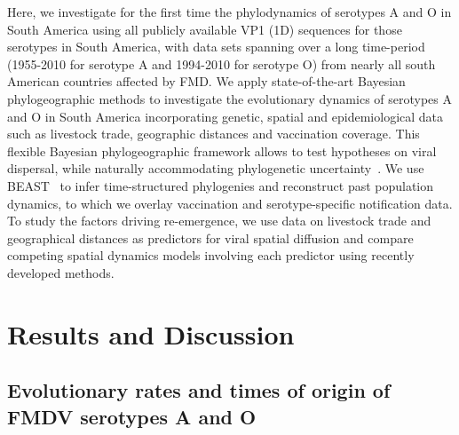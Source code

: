 \documentclass[10pt]{article}
\begin{document}
Here, we investigate for the first time the phylodynamics of serotypes A and O in South America using all publicly available VP1 (1D) sequences for those serotypes in South America, with data sets spanning over a long time-period (1955-2010 for serotype A and 1994-2010 for serotype O) from nearly all south American countries affected by FMD.
We apply state-of-the-art Bayesian phylogeographic methods to investigate the evolutionary dynamics of serotypes A and O in South America incorporating  genetic, spatial and epidemiological data such as livestock trade, geographic distances and vaccination coverage.
This flexible Bayesian phylogeographic framework allows to test hypotheses on viral dispersal, while naturally accommodating phylogenetic uncertainty~\cite{roots, towards}.
We use BEAST~\cite{beast2012} to infer time-structured phylogenies and reconstruct past population dynamics, to which we overlay vaccination and serotype-specific notification data.
To study the factors driving re-emergence, we use data on livestock trade and geographical distances as predictors for viral spatial diffusion and compare competing spatial dynamics models involving each predictor using recently developed methods. %

\section*{Results and Discussion}

\subsection*{Evolutionary rates and times of origin of FMDV serotypes A and O}
\end{document}
